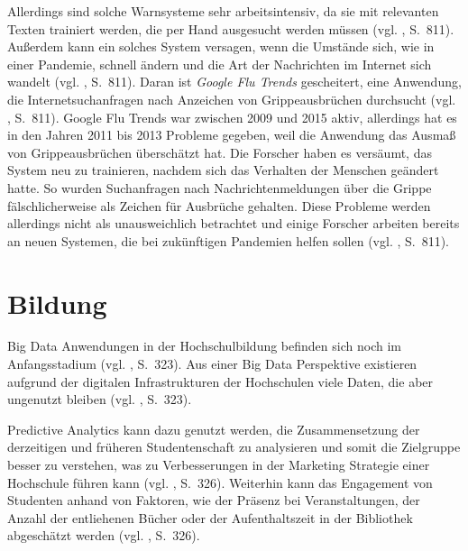 Allerdings sind solche Warnsysteme sehr arbeitsintensiv, da sie mit relevanten Texten trainiert werden, die per Hand
ausgesucht werden müssen (vgl. \cite{Cho}, S.~811). Außerdem kann ein solches System versagen, wenn die Umstände sich, wie
in einer Pandemie, schnell ändern und die Art der Nachrichten im Internet sich wandelt (vgl. \cite{Cho}, S.~811). Daran ist
\emph{Google Flu Trends} gescheitert, eine Anwendung, die Internetsuchanfragen nach Anzeichen von Grippeausbrüchen durchsucht
(vgl. \cite{Cho}, S.~811). Google Flu Trends war zwischen 2009 und 2015 aktiv, allerdings hat es in den Jahren 2011 bis 2013
Probleme gegeben, weil die Anwendung das Ausmaß von Grippeausbrüchen überschätzt hat. Die Forscher haben es versäumt, das System
neu zu trainieren, nachdem sich das Verhalten der Menschen geändert hatte. So wurden Suchanfragen nach Nachrichtenmeldungen über
die Grippe fälschlicherweise als Zeichen für Ausbrüche gehalten. Diese Probleme werden allerdings nicht als unausweichlich betrachtet
und einige Forscher arbeiten bereits an neuen Systemen, die bei zukünftigen Pandemien helfen sollen (vgl. \cite{Cho}, S.~811).


\section{Bildung}


Big Data Anwendungen in der Hochschulbildung befinden sich noch im Anfangsstadium
(vgl. \cite{Chaurasia}, S.~323). Aus einer Big Data Perspektive existieren aufgrund
der digitalen Infrastrukturen der Hochschulen viele Daten, die aber ungenutzt bleiben
(vgl. \cite{Chaurasia}, S.~323).

Predictive Analytics kann dazu genutzt werden, die Zusammensetzung der derzeitigen und früheren Studentenschaft zu
analysieren und somit die Zielgruppe besser zu verstehen, was zu Verbesserungen in der Marketing Strategie einer
Hochschule führen kann (vgl. \cite{Chaurasia}, S.~326). Weiterhin kann das Engagement von Studenten anhand von
Faktoren, wie der Präsenz bei Veranstaltungen, der Anzahl der entliehenen Bücher oder der Aufenthaltszeit in der
Bibliothek abgeschätzt werden (vgl. \cite{Chaurasia}, S.~326).

